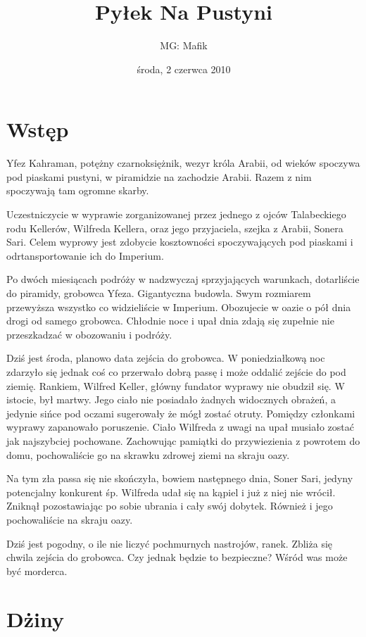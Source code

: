 \documentclass[11pt]{article}
\title{Pyłek Na Pustyni}
\author{MG: Mafik}
\date{środa, 2 czerwca 2010}
\begin{document}
\maketitle


\section*{Wstęp}
\label{sec-1}

  Yfez Kahraman, potężny czarnoksiężnik, wezyr króla Arabii, od
  wieków spoczywa pod piaskami pustyni, w piramidzie na zachodzie
  Arabii. Razem z nim spoczywają tam ogromne skarby.

  Uczestniczycie w wyprawie zorganizowanej przez jednego z ojców
  Talabeckiego rodu Kellerów, Wilfreda Kellera, oraz jego
  przyjaciela, szejka z Arabii, Sonera Sari. Celem wyprowy jest
  zdobycie kosztowności spoczywających pod piaskami i
  odrtansportowanie ich do Imperium.

  Po dwóch miesiącach podróży w nadzwyczaj sprzyjających warunkach,
  dotarliście do piramidy, grobowca Yfeza. Gigantyczna budowla. Swym
  rozmiarem przewyższa wszystko co widzieliście w
  Imperium. Obozujecie w oazie o pół dnia drogi od samego
  grobowca. Chłodnie noce i upał dnia zdają się zupełnie nie
  przeszkadzać w obozowaniu i podróży.

  Dziś jest środa, planowo data zejścia do grobowca. W
  poniedziałkową noc zdarzyło się jednak coś co przerwało dobrą
  passę i może oddalić zejście do pod ziemię. Rankiem, Wilfred
  Keller, główny fundator wyprawy nie obudził się. W istocie, był
  martwy. Jego ciało nie posiadało żadnych widocznych obrażeń, a
  jedynie sińce pod oczami sugerowały że mógł zostać
  otruty. Pomiędzy członkami wyprawy zapanowało poruszenie. Ciało
  Wilfreda z uwagi na upał musiało zostać jak najszybciej
  pochowane. Zachowując pamiątki do przywiezienia z powrotem do
  domu, pochowaliście go na skrawku zdrowej ziemi na skraju oazy.

  Na tym zła passa się nie skończyła, bowiem następnego dnia, Soner
  Sari, jedyny potencjalny konkurent śp. Wilfreda udał się na kąpiel
  i już z niej nie wrócił. Zniknął pozostawiając po sobie ubrania i
  cały swój dobytek. Również i jego pochowaliście na skraju oazy.

  Dziś jest pogodny, o ile nie liczyć pochmurnych nastrojów,
  ranek. Zbliża się chwila zejścia do grobowca. Czy jednak będzie to
  bezpieczne? Wśród was może być morderca.

\section*{Dżiny}
\label{sec-2}
\end{document}
